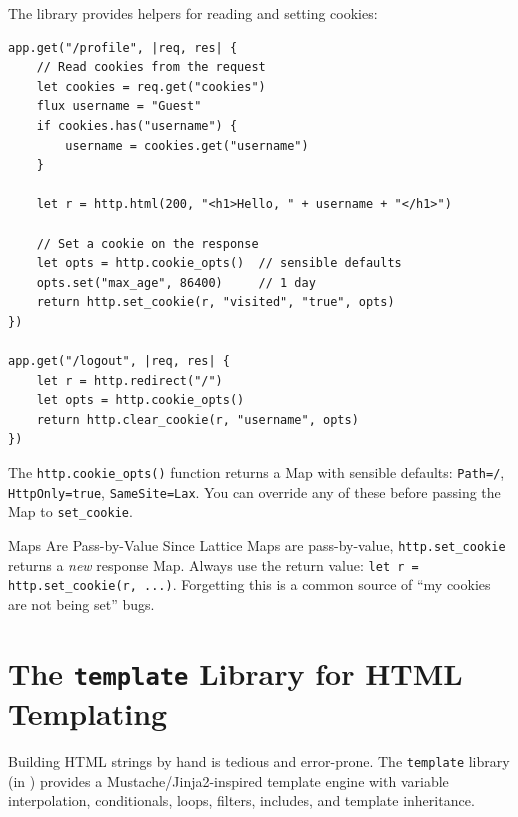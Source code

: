 
The library provides helpers for reading and setting cookies:

\begin{lstlisting}[language=Lattice, caption={Cookie handling}]
app.get("/profile", |req, res| {
    // Read cookies from the request
    let cookies = req.get("cookies")
    flux username = "Guest"
    if cookies.has("username") {
        username = cookies.get("username")
    }

    let r = http.html(200, "<h1>Hello, " + username + "</h1>")

    // Set a cookie on the response
    let opts = http.cookie_opts()  // sensible defaults
    opts.set("max_age", 86400)     // 1 day
    return http.set_cookie(r, "visited", "true", opts)
})

app.get("/logout", |req, res| {
    let r = http.redirect("/")
    let opts = http.cookie_opts()
    return http.clear_cookie(r, "username", opts)
})
\end{lstlisting}

The \lstinline|http.cookie_opts()| function returns a Map with sensible defaults: \lstinline|Path=/|, \lstinline|HttpOnly=true|, \lstinline|SameSite=Lax|.
You can override any of these before passing the Map to \lstinline|set_cookie|.

\begin{warnbox}{Maps Are Pass-by-Value}
Since Lattice Maps are pass-by-value, \lstinline|http.set_cookie| returns a \emph{new} response Map.
Always use the return value: \lstinline|let r = http.set_cookie(r, ...)|.
Forgetting this is a common source of ``my cookies are not being set'' bugs.
\end{warnbox}

\section{The \texttt{template} Library for HTML Templating}\label{sec:template-library}


Building HTML strings by hand is tedious and error-prone.
The \lstinline|template| library (in ) provides a Mustache/Jinja2-inspired template engine with variable interpolation, conditionals, loops, filters, includes, and template inheritance.

